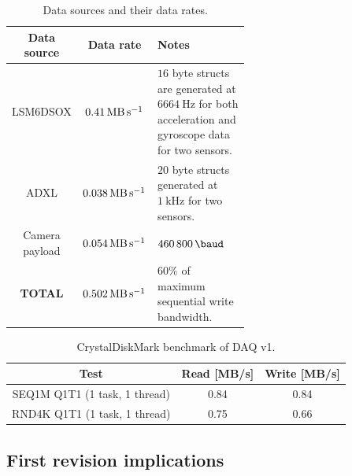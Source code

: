 \documentclass[]{report}
\begin{document}
\begin{table}[H]
  \centering
  \begin{tabular}{|c|c|L{0.6\linewidth}|}
    \hline
    \textbf{Data source} & \textbf{Data rate}                  & \textbf{Notes}                                                                                                   \\\hline
    LSM6\-DSOX           & $\SI{0.41}{\mega\byte\per\second}$  & $16$ byte structs are generated at $\SI{6664}{\hertz}$ for both acceleration and gyroscope data for two sensors. \\\hline
    ADXL            & $\SI{0.038}{\mega\byte\per\second}$ & $20$ byte structs generated at $\SI{1}{\kilo\hertz}$ for two sensors.                                            \\\hline
    Camera payload       & $\SI{0.054}{\mega\byte\per\second}$ & $\SI{460800}{\baud}$                                                                                             \\\hline
    \textbf{TOTAL}       & $\SI{0.502}{\mega\byte\per\second}$ & $60\%$ of maximum sequential write bandwidth.                                                                    \\\hline
  \end{tabular}
  \caption{Data sources and their data rates.}
  \label{tabl:daq-v1-sensor-datarate}
\end{table}

\begin{table}[H]
  \centering
  \begin{tabular}{|c|c|c|}
    \hline
    \textbf{Test}                 & \textbf{Read [MB/s]} & \textbf{Write [MB/s]} \\\hline
    SEQ1M Q1T1 (1 task, 1 thread) & 0.84                 & 0.84                  \\\hline
    RND4K Q1T1 (1 task, 1 thread) & 0.75                 & 0.66                  \\\hline
  \end{tabular}
  \caption{CrystalDiskMark benchmark of DAQ v1.}
  \label{tabl:daq-v1-diskmark}
\end{table}

\subsection{First revision implications}
\end{document}
